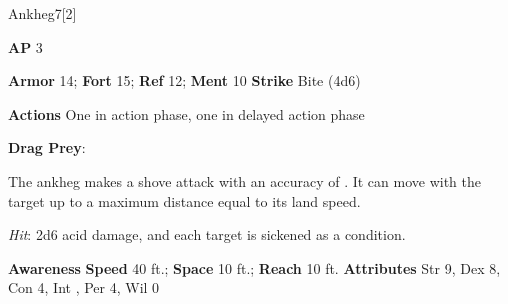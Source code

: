 \begin{monsection}{Ankheg}{7}[2]
\vspace{-1em}\vspace{-1em}
\begin{spellcontent}
\begin{spelltargetinginfo}
{\textbf{AP} 3}

\pari \textbf{Armor} 14;
\textbf{Fort} 15;
\textbf{Ref} 12;
\textbf{Ment} 10
\pari \textbf{Strike} Bite  (4d6)


\pari \textbf{Actions} One in action phase, one in delayed action phase
\end{spelltargetinginfo}


\begin{spelleffects}

\pari
\textbf{Drag Prey}:

The ankheg makes a shove attack with an accuracy of .
It can move with the target up to a maximum distance equal to its land speed.




\vspace{0.5em}
\pari

\par


\par \textit{Hit}: 2d6 acid damage, and each target is sickened as a condition.


\end{spelleffects}

\end{spellcontent}

\begin{monsterfooter}
\pari \textbf{Awareness} 
\pari \textbf{Speed} 40 ft.;
\textbf{Space} 10 ft.;
\textbf{Reach} 10 ft.
\pari \textbf{Attributes}
Str 9,
Dex 8,
Con 4,
Int ,
Per 4,
Wil 0
\end{monsterfooter}
\end{monsection}



